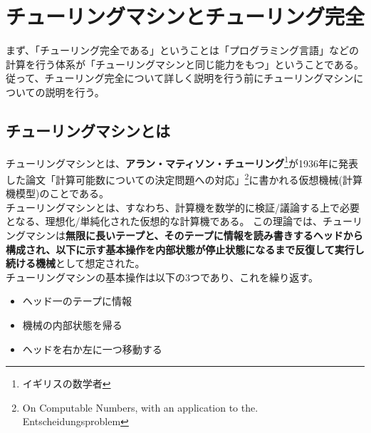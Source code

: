 \chapter{チューリングマシンとチューリング完全}{
	まず、「チューリング完全である」ということは「プログラミング言語」などの計算を行う体系が「チューリングマシンと同じ能力をもつ」ということである。
	従って、チューリング完全について詳しく説明を行う前にチューリングマシンについての説明を行う。\\
			
	\section{チューリングマシンとは}{
		チューリングマシンとは、{\bf アラン・マティソン・チューリング}\footnote{イギリスの数学者}が1936年に発表した論文「計算可能数についての決定問題への対応」\footnote{On Computable Numbers, with an application to the. Entscheidungsproblem}に書かれる仮想機械(計算機模型)のことである。\\
		チューリングマシンとは、すなわち、計算機を数学的に検証/議論する上で必要となる、理想化/単純化された仮想的な計算機である。
		この理論では、チューリングマシンは{\bf 無限に長いテープと、そのテープに情報を読み書きするヘッドから構成され、以下に示す基本操作を内部状態が停止状態になるまで反復して実行し続ける機械}として想定された。\\
		チューリングマシンの基本操作は以下の3つであり、これを繰り返す。\\
		\begin{itemize}
			\item ヘッド一のテープに情報
			\item 機械の内部状態を帰る
			\item ヘッドを右か左に一つ移動する
		\end{itemize}
	}
}
